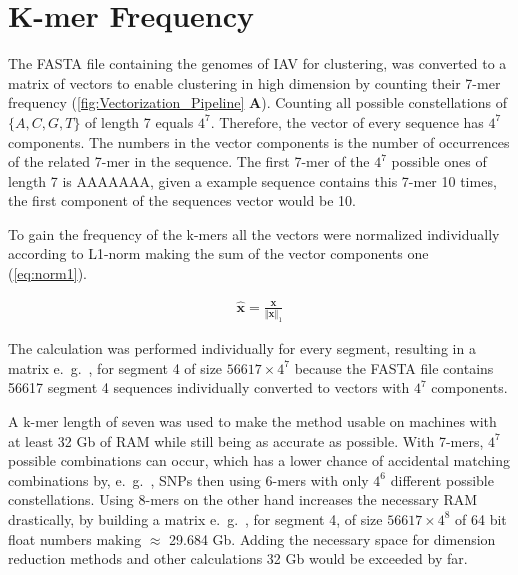 \section{K-mer Frequency} \label{sec:Frequency}

The FASTA file containing the genomes of \gls{IAV} for clustering, was converted to a matrix of vectors to enable clustering in high dimension by counting their 7-mer frequency (\autoref{fig:Vectorization_Pipeline} \textsf{\textbf{A}}). Counting all possible constellations of $\{A,C,G,T\}$ of length 7 equals $4^7$. Therefore, the vector of every sequence has $4^7$ components. The numbers in the vector components is the number of occurrences of the related 7-mer in the sequence. The first 7-mer of the $4^7$ possible ones of length 7 is AAAAAAA, given a example sequence contains this 7-mer 10 times, the first component of the sequences vector would be 10.

To gain the frequency of the k-mers all the vectors were normalized individually according to L1-norm making the sum of the vector components one (\autoref{eq:norm1}). 

\begin{equation}\label{eq:norm1}
    \begin{aligned}
        \mathbf{\hat{x}} = \frac{\mathbf{x}}{\Vert\mathbf{x}\Vert_1}
    \end{aligned}
\end{equation}

The calculation was performed individually for every segment, resulting in a matrix e.~g.~, for segment 4 of size $56617 \times 4^7$ because the FASTA file contains 56617 segment 4 sequences individually converted to vectors with $4^7$ components.

A k-mer length of seven was used to make the method usable on machines with at least 32 Gb of RAM while still being as accurate as possible. With 7-mers, $4^7$ possible combinations can occur, which has a lower chance of accidental matching combinations by, e.~g.~, \glspl{SNP} then using 6-mers with only $4^6$ different possible constellations. Using 8-mers on the other hand increases the necessary RAM drastically, by building a matrix e.~g.~, for segment 4, of size $56617 \times 4^8$ of 64 bit float numbers making $\approx$ 29.684 Gb. Adding the necessary space for dimension reduction methods and other calculations 32 Gb would be exceeded by far. 


